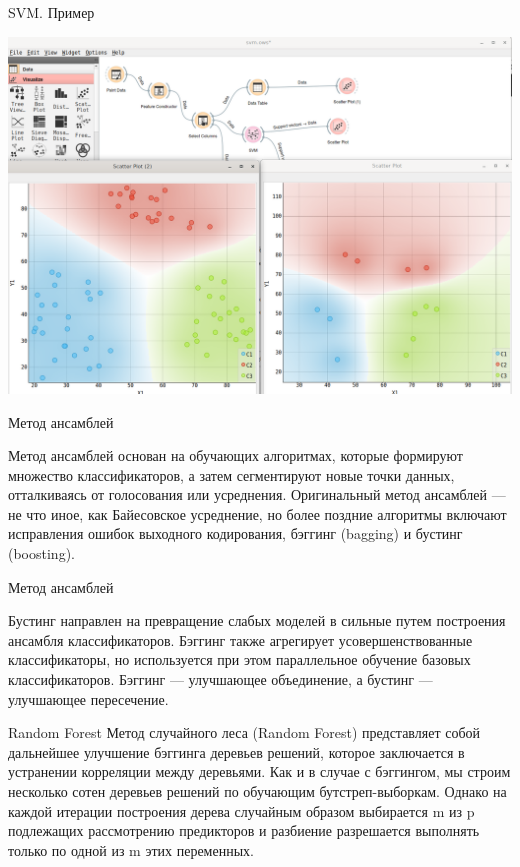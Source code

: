 \documentclass[10pt,pdf,hyperref={unicode}]{beamer}
\begin{document}
\begin{frame}{SVM. Пример}


\includegraphics[scale=0.2]{images/task09_01.png}

\end{frame}

\begin{frame}{Метод ансамблей}

Метод ансамблей основан на обучающих алгоритмах, которые формируют множество классификаторов, а затем сегментируют 
новые точки данных, отталкиваясь от голосования или усреднения. 
Оригинальный метод ансамблей — не что иное, как Байесовское усреднение, но более поздние алгоритмы включают исправления ошибок выходного кодирования, бэггинг (bagging) и бустинг (boosting). 
\end{frame}


\begin{frame}{Метод ансамблей}

Бустинг направлен на превращение слабых моделей в сильные путем построения ансамбля классификаторов. 
Бэггинг также агрегирует усовершенствованные классификаторы, но используется при этом параллельное обучение 
базовых классификаторов. Бэггинг — улучшающее объединение, а бустинг — улучшающее пересечение.
\end{frame}


\begin{frame}{Random Forest}
Метод случайного леса (Random Forest) представляет собой дальнейшее улучшение бэггинга деревьев решений, 
которое заключается в устранении корреляции между деревьями. Как и в случае с бэггингом,
 мы строим несколько сотен деревьев решений по обучающим бутстреп-выборкам. 
 Однако на каждой итерации построения дерева случайным образом выбирается m из p подлежащих рассмотрению предикторов и разбиение разрешается выполнять только по одной из m этих переменных.
\end{frame}
\end{document}
